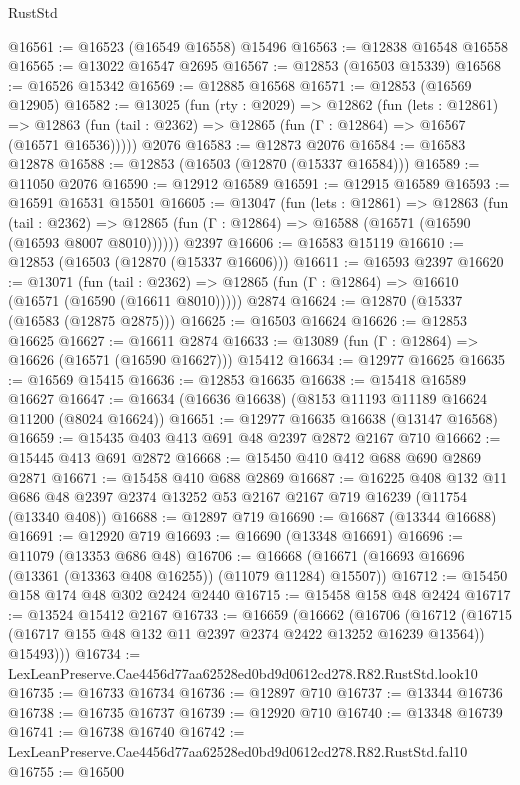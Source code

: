 \begin{lexlean}{RustStd}
\begin{coremodule}
@16561 := @16523 (@16549 @16558) @15496
@16563 := @12838 @16548 @16558
@16565 := @13022 @16547 @2695
@16567 := @12853 (@16503 @15339)
@16568 := @16526 @15342
@16569 := @12885 @16568
@16571 := @12853 (@16569 @12905)
@16582 := @13025
    (fun (rty : @2029) =>
    @12862
      (fun (lets : @12861) =>
      @12863 (fun (tail : @2362) => @12865 (fun (Γ : @12864) => @16567 (@16571 @16536)))))
    @2076
@16583 := @12873 @2076
@16584 := @16583 @12878
@16588 := @12853 (@16503 (@12870 (@15337 @16584)))
@16589 := @11050 @2076
@16590 := @12912 @16589
@16591 := @12915 @16589
@16593 := @16591 @16531 @15501
@16605 := @13047
    (fun (lets : @12861) =>
    @12863
      (fun (tail : @2362) =>
      @12865 (fun (Γ : @12864) => @16588 (@16571 (@16590 (@16593 @8007 @8010))))))
    @2397
@16606 := @16583 @15119
@16610 := @12853 (@16503 (@12870 (@15337 @16606)))
@16611 := @16593 @2397
@16620 := @13071
    (fun (tail : @2362) => @12865 (fun (Γ : @12864) => @16610 (@16571 (@16590 (@16611 @8010)))))
    @2874
@16624 := @12870 (@15337 (@16583 (@12875 @2875)))
@16625 := @16503 @16624
@16626 := @12853 @16625
@16627 := @16611 @2874
@16633 := @13089 (fun (Γ : @12864) => @16626 (@16571 (@16590 @16627))) @15412
@16634 := @12977 @16625
@16635 := @16569 @15415
@16636 := @12853 @16635
@16638 := @15418 @16589 @16627
@16647 := @16634 (@16636 @16638) (@8153 @11193 @11189 @16624 @11200 (@8024 @16624))
@16651 := @12977 @16635 @16638 (@13147 @16568)
@16659 := @15435 @403 @413 @691 @48 @2397 @2872 @2167 @710
@16662 := @15445 @413 @691 @2872
@16668 := @15450 @410 @412 @688 @690 @2869 @2871
@16671 := @15458 @410 @688 @2869
@16687 := @16225
    @408
    @132
    @11
    @686
    @48
    @2397
    @2374
    @13252
    @53
    @2167
    @2167
    @719
    @16239
    (@11754 (@13340 @408))
@16688 := @12897 @719
@16690 := @16687 (@13344 @16688)
@16691 := @12920 @719
@16693 := @16690 (@13348 @16691)
@16696 := @11079 (@13353 @686 @48)
@16706 := @16668 (@16671 (@16693 @16696 (@13361 (@13363 @408 @16255)) (@11079 @11284) @15507))
@16712 := @15450 @158 @174 @48 @302 @2424 @2440
@16715 := @15458 @158 @48 @2424
@16717 := @13524 @15412 @2167
@16733 := @16659
    (@16662
      (@16706
        (@16712 (@16715 (@16717 @155 @48 @132 @11 @2397 @2374 @2422 @13252 @16239 @13564)) @15493)))
@16734 := LexLeanPreserve.Cae4456d77aa62528ed0bd9d0612cd278.R82.RustStd.look10
@16735 := @16733 @16734
@16736 := @12897 @710
@16737 := @13344 @16736
@16738 := @16735 @16737
@16739 := @12920 @710
@16740 := @13348 @16739
@16741 := @16738 @16740
@16742 := LexLeanPreserve.Cae4456d77aa62528ed0bd9d0612cd278.R82.RustStd.fal10
@16755 := @16500

\end{coremodule}
\end{lexlean}
